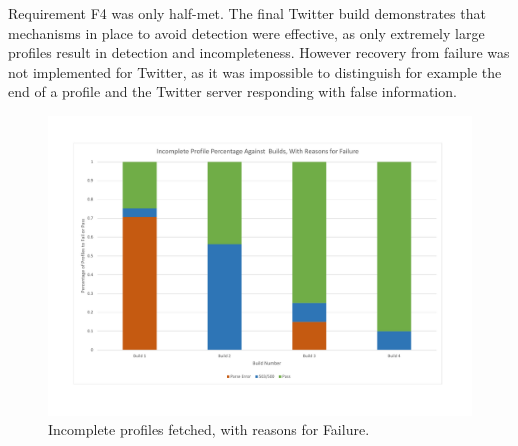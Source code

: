 Requirement F4 was only half-met. The final Twitter build demonstrates that mechanisms in place to avoid detection were effective, as only extremely large profiles result in detection and incompleteness. However recovery from failure was not implemented for Twitter, as it was impossible to distinguish for example the end of a profile and the Twitter server responding with false information. 


\begin{center}
\begin{figure}[h!]
\centering
\includegraphics[width=500px]{Images/failure_rate_and_reason.pdf}
\caption{Incomplete profiles fetched, with reasons for Failure.}
\label{fig:incom_profile_fetched}
\end{figure}
\end{center}



